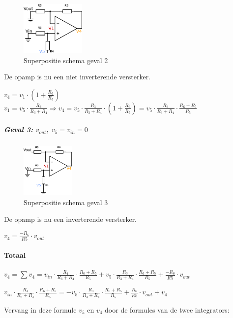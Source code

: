 \documentclass[a4paper,]{article}
\let\oldparagraph\paragraph
\renewcommand{\paragraph}[1]{\oldparagraph{#1}\mbox{}}
\let\oldsubparagraph\subparagraph
\renewcommand{\subparagraph}[1]{\oldsubparagraph{#1}\mbox{}}
\begin{document}
\begin{figure}
\centering
\includegraphics[width=\textwidth,height=1.04167in]{assets/superpositie2.png}
\caption{Superpositie schema geval 2}
\end{figure}

De opamp is nu een niet inverterende versterker.

\(v_4 = v_1 \cdot (1+\frac{R_6}{R_5})\)
\(v_1 = v_5 \cdot \frac{R_3}{R_3+R_4} \Rightarrow v_4 = v_5 \cdot \frac{R_3}{R_3+R_4} \cdot (1+\frac{R_6}{R_5}) = v_5 \cdot \frac{R_3}{R_3+R_4} \cdot \frac{R_6+R_5}{R_5}\)

\hypertarget{geval-3-v_out-v_5-v_in-0}{%
\subparagraph{\texorpdfstring{Geval 3: \(v_{out}\),
\(v_5 = v_{in} = 0\)}{Geval 3: v\_\{out\}, v\_5 = v\_\{in\} = 0}}\label{geval-3-v_out-v_5-v_in-0}}

\begin{figure}
\centering
\includegraphics[width=\textwidth,height=1.04167in]{assets/superpositie3.png}
\caption{Superpositie schema geval 3}
\end{figure}

De opamp is nu een inverterende versterker.

\(v_4 = \frac{-R_6}{R5} \cdot v_{out}\)

\hypertarget{totaal}{%
\paragraph{Totaal}\label{totaal}}

\(v_4 = \sum{v_4} = v_{in} \cdot \frac{R_4}{R_3+R_4} \cdot \frac{R_6+R_5}{R_5} + v_5 \cdot \frac{R_3}{R_3+R_4} \cdot \frac{R_6+R_5}{R_5} + \frac{-R_6}{R5} \cdot v_{out}\)

\(v_{in} \cdot \frac{R_4}{R_3+R_4} \cdot \frac{R_6+R_5}{R_5} = -v_5 \cdot \frac{R_3}{R_3+R_4} \cdot \frac{R_6+R_5}{R_5} + \frac{R_6}{R5} \cdot v_{out} + v_4\)

Vervang in deze formule \(v_5\) en \(v_4\) door de formules van de twee
integrators:
\end{document}
